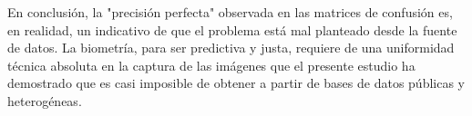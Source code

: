 En conclusión, la "precisión perfecta" observada en las matrices de confusión es, en realidad, un indicativo de que el problema está mal planteado desde la fuente de datos. La biometría, para ser predictiva y justa, requiere de una uniformidad técnica absoluta en la captura de las imágenes que el presente estudio ha demostrado que es casi imposible de obtener a partir de bases de datos públicas y heterogéneas.